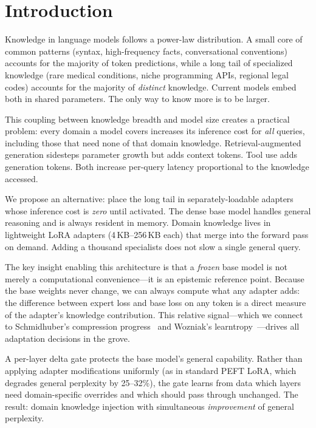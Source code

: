 \documentclass{article}
\begin{document}
\section{Introduction}
\label{sec:intro}

Knowledge in language models follows a power-law distribution. A small
core of common patterns (syntax, high-frequency facts, conversational
conventions) accounts for the majority of token predictions, while a
long tail of specialized knowledge (rare medical conditions, niche
programming APIs, regional legal codes) accounts for the majority of
\emph{distinct} knowledge. Current models embed both in shared
parameters. The only way to know more is to be larger.

This coupling between knowledge breadth and model size creates a
practical problem: every domain a model covers increases its inference
cost for \emph{all} queries, including those that need none of that
domain knowledge. Retrieval-augmented generation sidesteps parameter
growth but adds context tokens. Tool use adds generation tokens. Both
increase per-query latency proportional to the knowledge accessed.

We propose an alternative: place the long tail in separately-loadable
adapters whose inference cost is \emph{zero} until activated. The dense
base model handles general reasoning and is always resident in memory.
Domain knowledge lives in lightweight LoRA adapters (4\,KB--256\,KB
each) that merge into the forward pass on demand. Adding a thousand
specialists does not slow a single general query.

The key insight enabling this architecture is that a \emph{frozen} base
model is not merely a computational convenience---it is an epistemic
reference point. Because the base weights never change, we can always
compute what any adapter adds: the difference between expert loss and
base loss on any token is a direct measure of the adapter's knowledge
contribution. This relative signal---which we connect to Schmidhuber's
compression progress~\cite{schmidhuber2008} and Wozniak's
learntropy~\cite{wozniak2018learntropy}---drives all adaptation
decisions in the grove.

A per-layer delta gate protects the base model's general capability.
Rather than applying adapter modifications uniformly (as in standard PEFT
LoRA, which degrades general perplexity by 25--32\%), the gate learns
from data which layers need domain-specific overrides and which should
pass through unchanged. The result: domain knowledge injection with
simultaneous \emph{improvement} of general perplexity.
\end{document}
